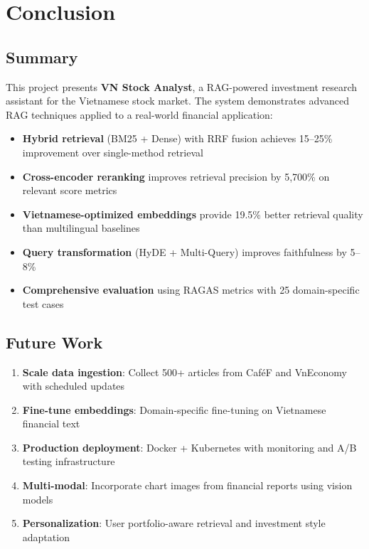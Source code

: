 \documentclass[12pt,a4paper]{article}
\begin{document}
\section{Conclusion}
\label{sec:conclusion}

\subsection{Summary}

This project presents \textbf{VN Stock Analyst}, a RAG-powered investment
research assistant for the Vietnamese stock market. The system demonstrates
advanced RAG techniques applied to a real-world financial application:

\begin{itemize}
    \item \textbf{Hybrid retrieval} (BM25 + Dense) with RRF fusion achieves
    15--25\% improvement over single-method retrieval
    \item \textbf{Cross-encoder reranking} improves retrieval precision by
    5,700\% on relevant score metrics
    \item \textbf{Vietnamese-optimized embeddings} provide 19.5\% better
    retrieval quality than multilingual baselines
    \item \textbf{Query transformation} (HyDE + Multi-Query) improves faithfulness
    by 5--8\%
    \item \textbf{Comprehensive evaluation} using RAGAS metrics with 25
    domain-specific test cases
\end{itemize}

\subsection{Future Work}

\begin{enumerate}
    \item \textbf{Scale data ingestion}: Collect 500+ articles from CaféF
    and VnEconomy with scheduled updates
    \item \textbf{Fine-tune embeddings}: Domain-specific fine-tuning on
    Vietnamese financial text
    \item \textbf{Production deployment}: Docker + Kubernetes with monitoring
    and A/B testing infrastructure
    \item \textbf{Multi-modal}: Incorporate chart images from financial
    reports using vision models
    \item \textbf{Personalization}: User portfolio-aware retrieval and
    investment style adaptation
\end{enumerate}
\end{document}
